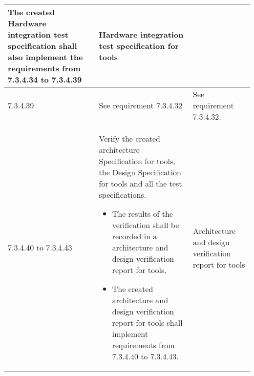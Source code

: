 \documentclass{template/openetcs_report}
\begin{document}
{\begin{longtable}{|p{2cm}|p{9cm}|p{3cm}|}
The created Hardware integration test specification shall also implement the requirements from 7.3.4.34 to 7.3.4.39
& Hardware integration test specification for tools\\ 
\hline
7.3.4.39 & See requirement 7.3.4.32 & See requirement 7.3.4.32.\\ 
\hline
7.3.4.40 to 7.3.4.43 & Verify the created architecture Specification for tools, the Design Specification for tools and all the test specifications.
\begin{itemize}\itemsep=0pt
  \item The results of the verification shall be recorded in a architecture and design verification report for tools,
  \item The created architecture and design verification report for tools shall implement requirements from 7.3.4.40 to 7.3.4.43. 
\end{itemize}
& Architecture and design verification report for tools\\ 
\hline
\end{longtable}}
\end{document}
